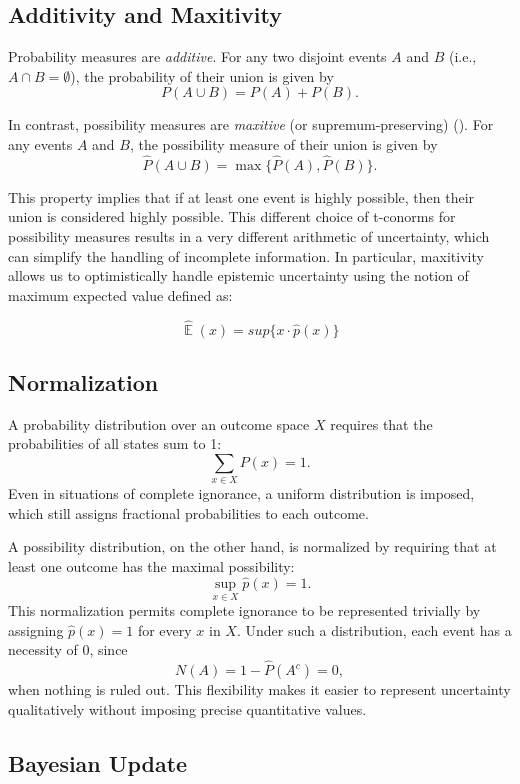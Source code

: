 \documentclass[11pt,a4paper]{report}
\DeclareMathOperator{\EX}{\mathbb{E}}
\begin{document}
\subsection{Additivity and Maxitivity}
Probability measures are \emph{additive}. For any two disjoint events \(A\) and \(B\) (i.e., \(A\cap B=\emptyset\)), the probability of their union is given by
\sloppy
\[
P(A \cup B) = P(A) + P(B).
\]


\sloppy

In contrast, possibility measures are \emph{maxitive} (or supremum-preserving) (\cite{Dubois:2007}). For any events \(A\) and \(B\), the possibility measure of their union is given by
\sloppy
\[
  \hat{P}(A \cup B) = \max\{\hat{P}(A), \hat{P}(B)\}.
\]

This property implies that if at least one event is highly possible, then their union is considered highly possible. This different choice of t-conorms for possibility measures results in a very different arithmetic of uncertainty, which can simplify the handling of incomplete information. In particular, maxitivity allows us to optimistically handle epistemic uncertainty using the notion of maximum expected value defined as:

\[
\hat{\EX}(x) = sup\{x \cdot \hat{p}(x)\}
\]

\par 

\subsection{Normalization}
A probability distribution over an outcome space \(X\) requires that the probabilities of all states sum to 1:
\[
\sum_{x \in X} P(x) = 1.
\]
Even in situations of complete ignorance, a uniform distribution is imposed, which still assigns fractional probabilities to each outcome.

A possibility distribution, on the other hand, is normalized by requiring that at least one outcome has the maximal possibility:
\[
  \sup_{x \in X} \hat{p}(x) = 1.
\]
This normalization permits complete ignorance to be represented trivially by assigning \( \hat{p}(x)=1 \) for every \(x\) in \(X\). Under such a distribution, each event has a necessity of 0, since
\[
N(A) = 1 - \hat{P}(A^c) = 0,
\]
when nothing is ruled out. This flexibility makes it easier to represent uncertainty qualitatively without imposing precise quantitative values.
\subsection{Bayesian Update}
\end{document}
